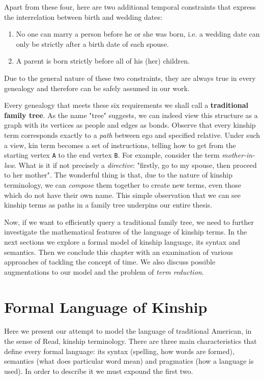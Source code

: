     Apart from these four, here are two additional temporal constraints that express the interrelation between birth and wedding
    dates:
    \begin{enumerate}
        \item{No one can marry a person before he or she was born, i.e. a wedding date can only be strictly after a
            birth date of each spouse.}
        \item{A parent is born strictly before all of his (her) children.}
    \end{enumerate}
    Due to the general nature of these two constraints, they are always true in every genealogy and therefore can be safely
    assumed in our work.

    Every genealogy that meets these six requirements we shall call a \textbf{traditional family tree}. As the name "tree" suggests,
    we can indeed view this structure as a graph with its vertices as people and edges as bonds. Observe that every kinship term
    corresponds exactly to a \textit{path} between ego and specified relative. Under such a view, kin term becomes a set of instructions,
    telling how to get from the starting vertex \texttt{A} to the end vertex \texttt{B}. For example, consider the term
    \textit{mother-in-law}. What is it if not precisely a \textit{directive}: "firstly, go to my spouse, then proceed to her mother".
    The wonderful thing is that, due to the nature of kinship terminology, we can \textit{compose} them together to create
    new terms, even those which do not have their own name. This simple observation that we can see kinship terms as paths in a family
    tree underpins our entire thesis.

    Now, if we want to efficiently query a traditional family tree, we need to further investigate the mathematical features of
    the language of kinship terms. In the next sections we explore a formal model of kinship language, its syntax and semantics.
    Then we conclude this chapter with an examination of various approaches of tackling the concept of time. We also discuss
    possible augmentations to our model and the problem of \textit{term reduction}.

\section{Formal Language of Kinship}
\label{sec:formal}
    Here we present our attempt to model the language of traditional American, in the sense of Read\cite{read}, kinship terminology.
    There are three main characteristics that define every formal language: its syntax (spelling, how words are formed), semantics
    (what does particular word mean) and pragmatics (how a language is used). In order to describe it we must expound the first two.

